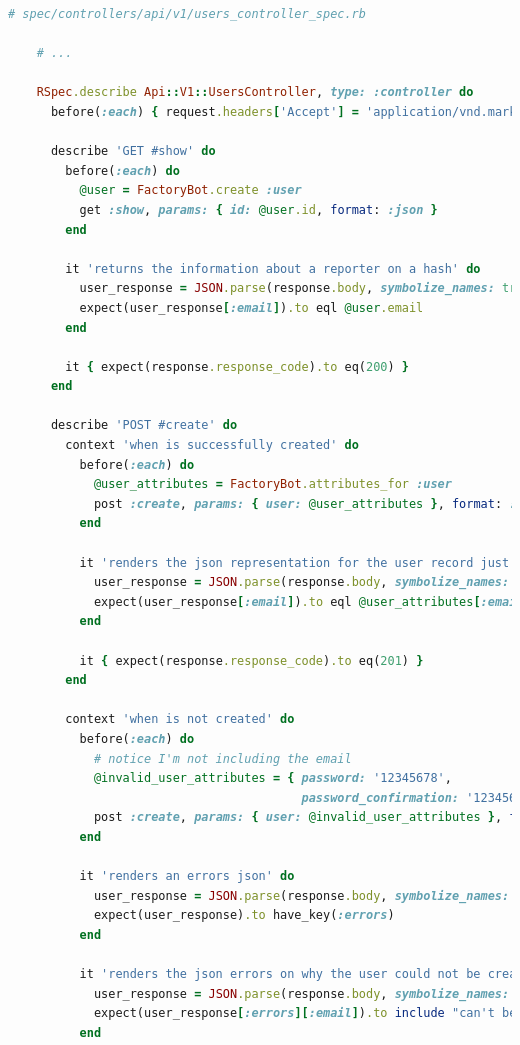 \documentclass[]{report}
\begin{document}
  \begin{scriptsize}
    \begin{lstlisting}[language=ruby, caption={Le fichier de test du contrôlleur avant la refactorisation}, label={lst:users_controller_spec_before_factorization}]
    # spec/controllers/api/v1/users_controller_spec.rb

    # ...

    RSpec.describe Api::V1::UsersController, type: :controller do
      before(:each) { request.headers['Accept'] = 'application/vnd.marketplace.v1' }

      describe 'GET #show' do
        before(:each) do
          @user = FactoryBot.create :user
          get :show, params: { id: @user.id, format: :json }
        end

        it 'returns the information about a reporter on a hash' do
          user_response = JSON.parse(response.body, symbolize_names: true)
          expect(user_response[:email]).to eql @user.email
        end

        it { expect(response.response_code).to eq(200) }
      end

      describe 'POST #create' do
        context 'when is successfully created' do
          before(:each) do
            @user_attributes = FactoryBot.attributes_for :user
            post :create, params: { user: @user_attributes }, format: :json
          end

          it 'renders the json representation for the user record just created' do
            user_response = JSON.parse(response.body, symbolize_names: true)
            expect(user_response[:email]).to eql @user_attributes[:email]
          end

          it { expect(response.response_code).to eq(201) }
        end

        context 'when is not created' do
          before(:each) do
            # notice I'm not including the email
            @invalid_user_attributes = { password: '12345678',
                                         password_confirmation: '12345678' }
            post :create, params: { user: @invalid_user_attributes }, format: :json
          end

          it 'renders an errors json' do
            user_response = JSON.parse(response.body, symbolize_names: true)
            expect(user_response).to have_key(:errors)
          end

          it 'renders the json errors on why the user could not be created' do
            user_response = JSON.parse(response.body, symbolize_names: true)
            expect(user_response[:errors][:email]).to include "can't be blank"
          end


\end{lstlisting}
\end{scriptsize}
\end{document}

